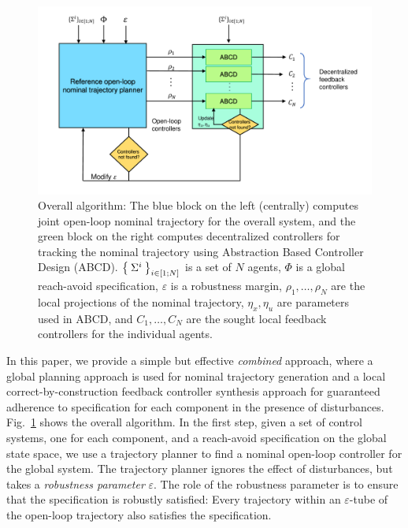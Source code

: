 \begin{figure}[t]
\includegraphics[scale=0.28]{figures/Algorithm_outline_updated.pdf}
\vspace*{-0.5cm}
\caption{Overall algorithm: The blue block on the left (centrally) computes joint open-loop nominal trajectory for the overall system, and the green block on the right computes decentralized controllers for tracking the nominal trajectory using Abstraction Based Controller Design (ABCD).
$\Set{\Sigma^i}_{i\in [1;N]}$ is a set of $N$ agents, $\Phi$ is a global reach-avoid specification, $\varepsilon$ is a robustness margin, $\rho_1,\ldots,\rho_N$ are the local projections of the nominal trajectory, $\eta_x,\eta_u$ are parameters used in ABCD, and $C_1,\ldots,C_N$ are the sought local feedback controllers for the individual agents.
}
\label{fig:overall}
\vspace*{-0.2cm}
\end{figure}

In this paper, we provide a simple but effective \emph{combined} approach, where a global planning approach is used for nominal trajectory generation and 
a local correct-by-construction feedback controller synthesis approach for guaranteed adherence to specification for each component
in the presence of disturbances.
Fig.~\ref{fig:overall} shows the overall algorithm.
In the first step, 
given a set of control systems, one for each component, and a reach-avoid specification on the global state space, we use a trajectory planner to
find a nominal open-loop controller for the global system.
The trajectory planner ignores the effect of disturbances, but takes a \emph{robustness parameter} $\varepsilon$.
The role of the robustness parameter is to ensure that the specification is robustly satisfied: 
Every trajectory within an $\varepsilon$-tube of the open-loop trajectory also satisfies the specification.

